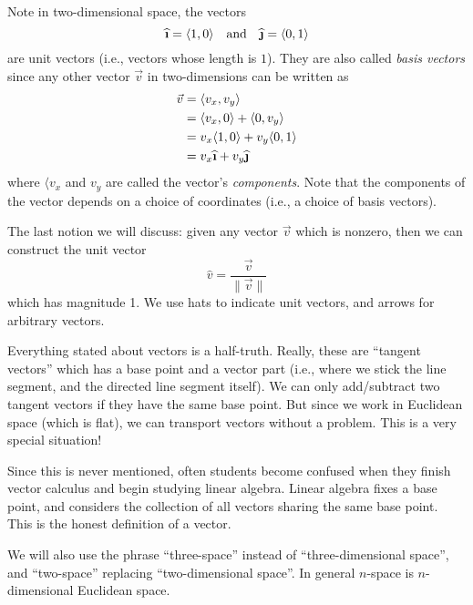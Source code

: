 Note in two-dimensional space, the vectors
\begin{equation}
\widehat{\textbf{\i}}=\langle 1,0\rangle
\quad\mbox{and}\quad
\widehat{\textbf{\j}}=\langle 0,1\rangle
\end{equation}
are unit vectors (i.e., vectors whose length is $1$). They are
also called \emph{basis vectors} since any other vector $\vec{v}$
in two-dimensions can be written as
\begin{equation}
\begin{aligned}
\vec{v}&=\langle v_{x}, v_{y}\rangle\\
&=\langle v_{x},0\rangle + \langle0,v_{y}\rangle\\
&=v_{x}\langle1,0\rangle + v_{y}\langle0,1\rangle\\
&=v_{x}\widehat{\textbf{\i}}+v_{y}\widehat{\textbf{\j}}
\end{aligned}
\end{equation}
where $\langle v_{x}$ and $v_{y}$ are called the vector's 
\emph{components}. Note that the components of the vector depends on a
choice of coordinates (i.e., a choice of basis vectors).

The last notion we will discuss: given any vector $\vec{v}$ which
is nonzero, then we can construct the unit vector
\begin{equation}
\widehat{v} = \frac{\vec{v}}{\|\vec{v}\|}
\end{equation}
which has magnitude 1. We use hats to indicate unit vectors, and
arrows for arbitrary vectors.

 Everything stated about vectors is a
half-truth. Really, these are ``tangent vectors'' which has a
base point and a vector part (i.e., where we stick the line
segment, and the directed line segment itself). We can only
add/subtract two tangent vectors if they have the same base point. 
But since we work in Euclidean space (which is flat), we can
transport vectors without a problem. This is a very special
situation! 

Since this is never mentioned, often students become confused
when they finish vector calculus and begin studying linear
algebra. Linear algebra fixes a base point, and considers the
collection of all vectors sharing the same base point. This is
the honest definition of a vector. 

\begin{remark}
We will also use the phrase ``three-space'' instead of
``three-dimensional space'', and ``two-space'' replacing
``two-dimensional space''. In general $n$-space is
$n$-dimensional Euclidean space.
\end{remark}

